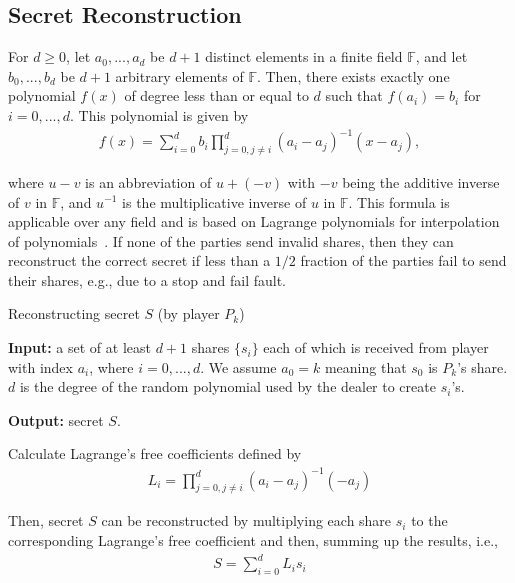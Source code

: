 \documentclass[11pt]{article}
\theoremstyle{plain}
\begin{document}
\subsection{Secret Reconstruction}

\label{sec:Shamir-Reconstruction} For $d\geq0$, let $a_{0},...,a_{d}$
be $d+1$ distinct elements in a finite field $\mathbb{F}$, and let
$b_{0},...,b_{d}$ be $d+1$ arbitrary elements of $\mathbb{F}$.
Then, there exists exactly one polynomial $f(x)$ of degree less than
or equal to $d$ such that $f(a_{i})=b_{i}$ for $i=0,...,d$. This
polynomial is given by 
\begin{align}
f(x)=\sum_{i=0}^{d}b_{i}\prod_{j=0,j\neq i}^{d}(a_{i}-a_{j})^{-1}(x-a_{j}),\label{eq:lagrange-polynomial}
\end{align}

where $u-v$ is an abbreviation of $u+(-v)$ with $-v$ being the
additive inverse of $v$ in $\mathbb{F}$, and $u^{-1}$ is the multiplicative
inverse of $u$ in $\mathbb{F}$. This formula is applicable over
any field and is based on Lagrange polynomials for interpolation of
polynomials~\cite{Huang:2010:URL}. If none of the parties send invalid
shares, then they can reconstruct the correct secret if less than
a $1/2$ fraction of the parties fail to send their shares, e.g.,
due to a stop and fail fault. 

\begin{algorithm}
	\caption{Reconstructing secret $S$ (by player $P_{k}$)}
	
	\label{pr:shamir-reconstruction} \textbf{Input:} a set of at least
	$d+1$ shares $\{s_{i}\}$ each of which is received from player with
	index $a_{i}$, where $i=0,...,d$. We assume $a_{0}=k$ meaning that
	$s_{0}$ is $P_{k}$'s share. $d$ is the degree of the random polynomial
	used by the dealer to create $s_{i}$'s.
	
	\textbf{Output:} secret $S$.
	
	Calculate Lagrange's free coefficients defined by 
	\begin{align}
	L_{i}=\prod_{j=0,j\neq i}^{d}(a_{i}-a_{j})^{-1}(-a_{j})\label{eq:lagrange-coeffs}
	\end{align}
	
	Then, secret $S$ can be reconstructed by multiplying each share $s_{i}$
	to the corresponding Lagrange's free coefficient and then, summing
	up the results, i.e., 
	\begin{align}
	S=\sum_{i=0}^{d}L_{i}s_{i}\label{eq:shamir-reconstruct}
	\end{align}
\end{algorithm}
\end{document}
